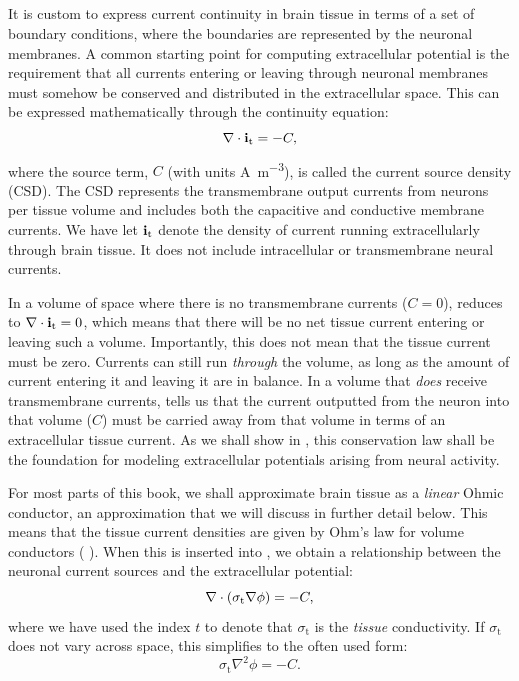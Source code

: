 \subsection{}
\label{sec:Basics:C}
It is custom to express current continuity in brain tissue in terms of a set of boundary conditions, where the boundaries are represented by the neuronal membranes. A common starting point for computing extracellular potential is the requirement that
all currents entering or leaving through neuronal membranes must somehow be conserved and distributed in the extracellular space. This can be expressed mathematically through the continuity equation:
\begin{equation}
{\bf \nabla} \cdot {\bf i}_\text{t} = -C,
\label{eq:Basics:continuity1}
\end{equation}
where the source term, $C$ (with units \si{\ampere\per\cubic\metre}), is called the current source density (CSD). The CSD represents the transmembrane output currents from neurons per tissue volume and includes both the capacitive and conductive membrane currents. We have let ${\bf i}_\text{t}$ denote the density of current running extracellularly through brain tissue. It does not include intracellular or transmembrane neural currents.

In a volume of space where there is no transmembrane currents ($C = 0$),  reduces to ${\bf \nabla} \cdot {\bf i}_\text{t} = 0$, which means that there will be no net tissue current entering or leaving such a volume. Importantly, this does not mean that the tissue current must be zero. Currents can still run \textit{through} the volume, as long as the amount of current entering it and leaving it are in balance. In a volume that \textit{does} receive transmembrane currents,  tells us that the current outputted from the neuron into that volume ($C$) must be carried away from that volume in terms of an extracellular tissue current. As we shall show in , this conservation law shall be the foundation for modeling extracellular potentials arising from neural activity.

For most parts of this book, we shall approximate brain tissue as a \textit{linear} Ohmic conductor, an approximation that we will discuss in further detail below. This means that the tissue current densities are given by Ohm's law for volume conductors ( ). When this is inserted into , we obtain a relationship between the neuronal current sources and the extracellular potential:
\begin{equation}
{\bf \nabla} \cdot \left(\sigma_\text{t} {\bf \nabla} {\phi} \right) = -C,
\label{eq:Basics:continuity2}
\end{equation}
where we have used the index $t$ to denote that $\sigma_\text{t}$ is the \textit{tissue} conductivity. If $\sigma_\text{t}$ does not vary across space, this simplifies to the often used form:
\begin{equation}
\sigma_\text{t} \nabla^2{\phi} = -C.
\label{eq:Basics:continuity3}
\end{equation}

